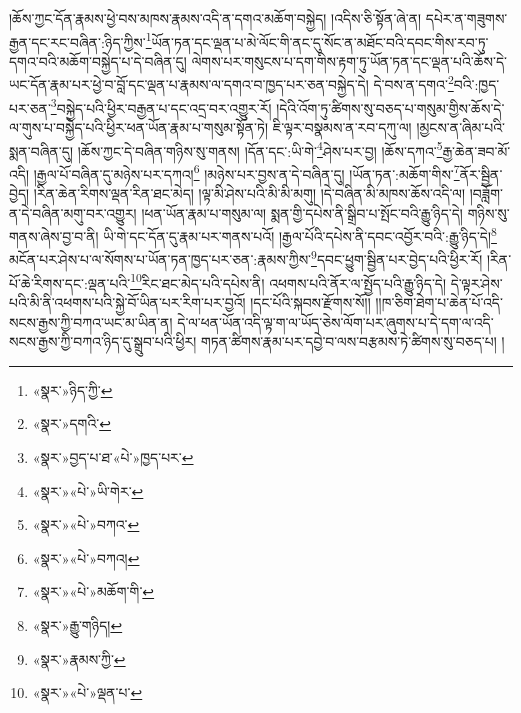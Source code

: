 །ཆོས་ཀྱང་དོན་རྣམས་ཕྱེ་བས་མཁས་རྣམས་འདི་ན་དགའ་མཆོག་བསྐྱེད། །འདིས་ཅི་སྟོན་ཞེ་ན། དཔེར་ན་གཟུགས་རྒྱན་དང་རང་བཞིན་:ཉིད་ཀྱིས་\footnote{«སྣར་»ཉིད་ཀྱི་}ཡོན་ཏན་དང་ལྡན་པ་མེ་ལོང་གི་ནང་དུ་སོང་ན་མཐོང་བའི་དབང་གིས་རབ་ཏུ་དགའ་བའི་མཆོག་བསྐྱེད་པ་དེ་བཞིན་དུ། ལེགས་པར་གསུངས་པ་དག་གིས་རྟག་ཏུ་ཡོན་ཏན་དང་ལྡན་པའི་ཆོས་དེ་ཡང་དོན་རྣམ་པར་ཕྱེ་བ་བློ་དང་ལྡན་པ་རྣམས་ལ་དགའ་བ་ཁྱད་པར་ཅན་བསྐྱེད་དེ། དེ་བས་ན་དགའ་\footnote{«སྣར་»དགའི་}བའི་:ཁྱད་པར་ཅན་\footnote{«སྣར་»བྱད་པ་ཐ་«པེ་»ཁྱད་པར་}བསྐྱེད་པའི་ཕྱིར་བརྒྱན་པ་དང་འདྲ་བར་འགྱུར་རོ། །དེའི་འོག་ཏུ་ཚིགས་སུ་བཅད་པ་གསུམ་གྱིས་ཆོས་དེ་ལ་གུས་པ་བསྐྱེད་པའི་ཕྱིར་ཕན་ཡོན་རྣམ་པ་གསུམ་སྟོན་ཏེ། ཇི་ལྟར་བསྣམས་ན་རབ་དཀུ་ལ། །མྱངས་ན་ཞིམ་པའི་སྨན་བཞིན་དུ། །ཆོས་ཀྱང་དེ་བཞིན་གཉིས་སུ་གནས། །དོན་དང་:ཡི་གེ་\footnote{«སྣར་»«པེ་»ཡི་གེར་}ཤེས་པར་བྱ། །ཆོས་དཀའ་\footnote{«སྣར་»«པེ་»བཀའ་}རྒྱ་ཆེན་ཟབ་མོ་འདི། །རྒྱལ་པོ་བཞིན་དུ་མཉེས་པར་དཀའ།\footnote{«སྣར་»«པེ་»བཀའ།} །མཉེས་པར་བྱས་ན་དེ་བཞིན་དུ། །ཡོན་ཏན་:མཆོག་གིས་\footnote{«སྣར་»«པེ་»མཆོག་གི་}ནོར་སྦྱིན་བྱེད། །རིན་ཆེན་རིགས་ལྡན་རིན་ཐང་མེད། །ལྟ་མི་ཤེས་པའི་མི་མི་མགུ། །དེ་བཞིན་མི་མཁས་ཆོས་འདི་ལ། །བཟློག་ན་དེ་བཞིན་མགུ་བར་འགྱུར། །ཕན་ཡོན་རྣམ་པ་གསུམ་ལ། སྨན་གྱི་དཔེས་ནི་སྒྲིབ་པ་སྤོང་བའི་རྒྱུ་ཉིད་དེ། གཉིས་སུ་གནས་ཞེས་བྱ་བ་ནི། ཡི་གེ་དང་དོན་དུ་རྣམ་པར་གནས་པའོ། །རྒྱལ་པོའི་དཔེས་ནི་དབང་འབྱོར་བའི་:རྒྱུ་ཉིད་དེ།\footnote{«སྣར་»རྒྱུ་གཉིད།} མངོན་པར་ཤེས་པ་ལ་སོགས་པ་ཡོན་ཏན་ཁྱད་པར་ཅན་:རྣམས་ཀྱིས་\footnote{«སྣར་»རྣམས་ཀྱི་}དབང་ཕྱུག་སྦྱིན་པར་བྱེད་པའི་ཕྱིར་རོ། །རིན་པོ་ཆེ་རིགས་དང་:ལྡན་པའི་\footnote{«སྣར་»«པེ་»ལྡན་པ་}རིང་ཐང་མེད་པའི་དཔེས་ནི། འཕགས་པའི་ནོར་ལ་སྤྱོད་པའི་རྒྱུ་ཉིད་དེ། དེ་ལྟར་ཤེས་པའི་མི་ནི་འཕགས་པའི་སྐྱེ་བོ་ཡིན་པར་རིག་པར་བྱའོ། །དང་པོའི་སྐབས་རྫོགས་སོ།། །།ཁ་ཅིག་ཐེག་པ་ཆེན་པོ་འདི་སངས་རྒྱས་ཀྱི་བཀའ་ཡང་མ་ཡིན་ན། དེ་ལ་ཕན་ཡོན་འདི་ལྟ་ག་ལ་ཡོད་ཅེས་ལོག་པར་ཞུགས་པ་དེ་དག་ལ་འདི་སངས་རྒྱས་ཀྱི་བཀའ་ཉིད་དུ་སྒྲུབ་པའི་ཕྱིར། གཏན་ཚིགས་རྣམ་པར་དབྱེ་བ་ལས་བརྩམས་ཏེ་ཚིགས་སུ་བཅད་པ། །
